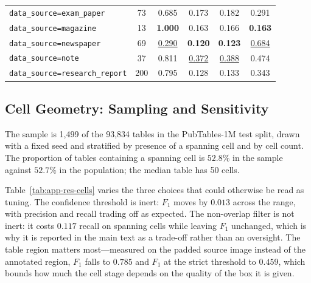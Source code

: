 \begin{table}[H]
{\begin{tabular}{@{}l c c c c c@{}}
    \texttt{data\_source=exam\_paper} & 73 & 0.685 & 0.173 & 0.182 & 0.291 \\
    \texttt{data\_source=magazine} & 13 & \textbf{1.000} & 0.163 & 0.166 & \textbf{0.163} \\
    \texttt{data\_source=newspaper} & 69 & \underline{0.290} & \textbf{0.120} & \textbf{0.123} & \underline{0.684} \\
    \texttt{data\_source=note} & 37 & 0.811 & \underline{0.372} & \underline{0.388} & 0.474 \\
    \texttt{data\_source=research\_report} & 200 & 0.795 & 0.128 & 0.133 & 0.343 \\
\bottomrule
\end{tabular}%
}
\end{table}

\subsection{Cell Geometry: Sampling and Sensitivity}
\label{app:cells}

The sample is 1{,}499 of the 93{,}834 tables in the PubTables-1M test split, drawn with a
fixed seed and stratified by presence of a spanning cell and by cell count. The proportion
of tables containing a spanning cell is $52.8\%$ in the sample against $52.7\%$ in the
population; the median table has 50 cells.

Table~\ref{tab:app-res-cells} varies the three choices that could otherwise be read as
tuning. The confidence threshold is inert: $F_1$ moves by $0.013$ across the range, with
precision and recall trading off as expected. The non-overlap filter is not inert: it
costs $0.117$ recall on spanning cells while leaving $F_1$ unchanged, which is why it is
reported in the main text as a trade-off rather than an oversight. The table region
matters most---measured on the padded source image instead of the annotated region, $F_1$
falls to $0.785$ and $F_1$ at the strict threshold to $0.459$, which bounds how much the
cell stage depends on the quality of the box it is given.

